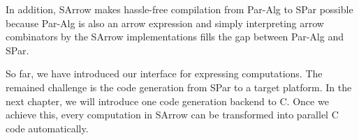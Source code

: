 In addition, SArrow makes hassle-free compilation from Par-Alg to SPar possible because Par-Alg is also an arrow expression and simply interpreting arrow combinators by the SArrow implementations fills the gap between Par-Alg and SPar.

So far, we have introduced our interface for expressing computations. The remained challenge is the code generation from SPar to a target platform. In the next chapter, we will introduce one code generation backend to C. Once we achieve this, every computation in SArrow can be transformed into parallel C code automatically.

